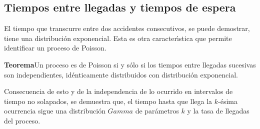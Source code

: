 \subsection{Tiempos entre llegadas y tiempos de espera}
El tiempo que transcurre entre dos accidentes consecutivos, se
puede demostrar, tiene una distribuci\'{o}n exponencial. Esta es otra
caracter\'{\i}stica que permite identificar un proceso de Poisson.
\par
{\bf Teorema}\hfill\break Un proceso es de Poisson si y s\'{o}lo si
los tiempos entre llegadas sucesivas son independientes,
id\'{e}nticamente distribuidos con distribuci\'{o}n exponencial.
\par
Consecuencia de esto y de la independencia de lo ocurrido en
intervalos de tiempo no solapados, se demuestra que, el tiempo
hasta que llega la $k$-\'{e}sima ocurrencia sigue una distribuci\'{o}n
$Gamma$ de par\'{a}metros $k$ y la tasa de llegadas del proceso.
